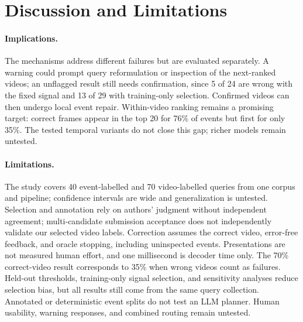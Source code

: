 \section{Discussion and Limitations}
\label{sec:discussion}

\paragraph{Implications.}
The mechanisms address different failures but are evaluated separately.
A warning could prompt query reformulation or inspection of the next-ranked videos; an unflagged result still needs confirmation, since 5 of 24 are wrong with the fixed signal and 13 of 29 with training-only selection.
Confirmed videos can then undergo local event repair.
Within-video ranking remains a promising target: correct frames appear in the top 20 for 76\% of events but first for only 35\%.
The tested temporal variants do not close this gap; richer models remain untested.

\paragraph{Limitations.}
The study covers 40 event-labelled and 70 video-labelled queries from one corpus and pipeline; confidence intervals are wide and generalization is untested.
Selection and annotation rely on authors' judgment without independent agreement; multi-candidate submission acceptance does not independently validate our selected video labels.
Correction assumes the correct video, error-free feedback, and oracle stopping, including uninspected events.
Presentations are not measured human effort, and one millisecond is decoder time only.
The 70\% correct-video result corresponds to 35\% when wrong videos count as failures.
Held-out thresholds, training-only signal selection, and sensitivity analyses reduce selection bias, but all results still come from the same query collection.
Annotated or deterministic event splits do not test an LLM planner.
Human usability, warning responses, and combined routing remain untested.
